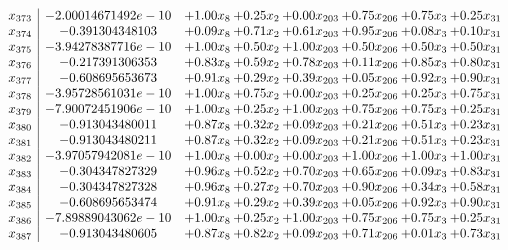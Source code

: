 \documentclass[8pt]{article}
\begin{document}
\[\begin{array}{c| c c@{\hskip 2pt} c@{\hskip 2pt} c@{\hskip 2pt} c@{\hskip 2pt} c@{\hskip 2pt} c@{\hskip 2pt} }
 x_{373}   &  -2.00014671492e-10 & +  1.00 x_{8} & +  0.25 x_{2} & +  0.00 x_{203} & +  0.75 x_{206} & +  0.75 x_{3} & +  0.25 x_{31}\\
 x_{374}   &  -0.391304348103 & +  0.09 x_{8} & +  0.71 x_{2} & +  0.61 x_{203} & +  0.95 x_{206} & +  0.08 x_{3} & +  0.10 x_{31}\\
 x_{375}   &  -3.94278387716e-10 & +  1.00 x_{8} & +  0.50 x_{2} & +  1.00 x_{203} & +  0.50 x_{206} & +  0.50 x_{3} & +  0.50 x_{31}\\
 x_{376}   &  -0.217391306353 & +  0.83 x_{8} & +  0.59 x_{2} & +  0.78 x_{203} & +  0.11 x_{206} & +  0.85 x_{3} & +  0.80 x_{31}\\
 x_{377}   &  -0.608695653673 & +  0.91 x_{8} & +  0.29 x_{2} & +  0.39 x_{203} & +  0.05 x_{206} & +  0.92 x_{3} & +  0.90 x_{31}\\
 x_{378}   &  -3.95728561031e-10 & +  1.00 x_{8} & +  0.75 x_{2} & +  0.00 x_{203} & +  0.25 x_{206} & +  0.25 x_{3} & +  0.75 x_{31}\\
 x_{379}   &  -7.90072451906e-10 & +  1.00 x_{8} & +  0.25 x_{2} & +  1.00 x_{203} & +  0.75 x_{206} & +  0.75 x_{3} & +  0.25 x_{31}\\
 x_{380}   &  -0.913043480011 & +  0.87 x_{8} & +  0.32 x_{2} & +  0.09 x_{203} & +  0.21 x_{206} & +  0.51 x_{3} & +  0.23 x_{31}\\
 x_{381}   &  -0.913043480211 & +  0.87 x_{8} & +  0.32 x_{2} & +  0.09 x_{203} & +  0.21 x_{206} & +  0.51 x_{3} & +  0.23 x_{31}\\
 x_{382}   &  -3.97057942081e-10 & +  1.00 x_{8} & +  0.00 x_{2} & +  0.00 x_{203} & +  1.00 x_{206} & +  1.00 x_{3} & +  1.00 x_{31}\\
 x_{383}   &  -0.304347827329 & +  0.96 x_{8} & +  0.52 x_{2} & +  0.70 x_{203} & +  0.65 x_{206} & +  0.09 x_{3} & +  0.83 x_{31}\\
 x_{384}   &  -0.304347827328 & +  0.96 x_{8} & +  0.27 x_{2} & +  0.70 x_{203} & +  0.90 x_{206} & +  0.34 x_{3} & +  0.58 x_{31}\\
 x_{385}   &  -0.608695653474 & +  0.91 x_{8} & +  0.29 x_{2} & +  0.39 x_{203} & +  0.05 x_{206} & +  0.92 x_{3} & +  0.90 x_{31}\\
 x_{386}   &  -7.89889043062e-10 & +  1.00 x_{8} & +  0.25 x_{2} & +  1.00 x_{203} & +  0.75 x_{206} & +  0.75 x_{3} & +  0.25 x_{31}\\
 x_{387}   &  -0.913043480605 & +  0.87 x_{8} & +  0.82 x_{2} & +  0.09 x_{203} & +  0.71 x_{206} & +  0.01 x_{3} & +  0.73 x_{31}\\

\end{array}\]
\end{document}
